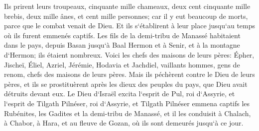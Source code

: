 \verse Ils prirent leurs troupeaux, cinquante mille chameaux, deux cent cinquante mille brebis, deux mille ânes, et cent mille personnes; 
\verse car il y eut beaucoup de morts, parce que le combat venait de Dieu. Et ils s`établirent à leur place jusqu`au temps où ils furent emmenés captifs. 
\verse Les fils de la demi-tribu de Manassé habitaient dans le pays, depuis Basan jusqu`à Baal Hermon et à Senir, et à la montagne d`Hermon; ils étaient nombreux. 
\verse Voici les chefs des maisons de leurs pères: Épher, Jischeï, Éliel, Azriel, Jérémie, Hodavia et Jachdiel, vaillants hommes, gens de renom, chefs des maisons de leurs pères. 
\verse Mais ils péchèrent contre le Dieu de leurs pères, et ils se prostituèrent après les dieux des peuples du pays, que Dieu avait détruits devant eux. 
\verse Le Dieu d`Israël excita l`esprit de Pul, roi d`Assyrie, et l`esprit de Tilgath Pilnéser, roi d`Assyrie, et Tilgath Pilnéser emmena captifs les Rubénites, les Gadites et la demi-tribu de Manassé, et il les conduisit à Chalach, à Chabor, à Hara, et au fleuve de Gozan, où ils sont demeurés jusqu`à ce jour. 

\chapter{}

